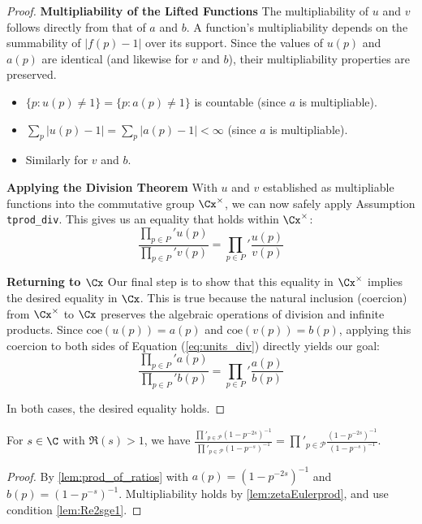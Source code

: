\begin{proof}
\textbf{Multipliability of the Lifted Functions}
The multipliability of $u$ and $v$ follows directly from that of $a$ and $b$. A function's multipliability depends on the summability of $|f(p) - 1|$ over its support. Since the values of $u(p)$ and $a(p)$ are identical (and likewise for $v$ and $b$), their multipliability properties are preserved.
\begin{itemize}
\item $\{p : u(p) \neq 1\} = \{p : a(p) \neq 1\}$ is countable (since $a$ is multipliable).
\item $\sum_{p} |u(p) - 1| = \sum_{p} |a(p) - 1| < \infty$ (since $a$ is multipliable).
\item Similarly for $v$ and $b$.
\end{itemize}

\textbf{Applying the Division Theorem}
With $u$ and $v$ established as multipliable functions into the commutative group $\Cx^\times$, we can now safely apply Assumption \texttt{tprod\_div}. This gives us an equality that holds within $\Cx^\times$:
\begin{equation}
\frac{\prod_{p \in P}' u(p)}{\prod_{p \in P}' v(p)} = \prod_{p \in P}' \frac{u(p)}{v(p)}
\label{eq:units_div}
\end{equation}

\textbf{Returning to $\Cx$}
Our final step is to show that this equality in $\Cx^\times$ implies the desired equality in $\Cx$. This is true because the natural inclusion (coercion) from $\Cx^\times$ to $\Cx$ preserves the algebraic operations of division and infinite products. Since $\text{coe}(u(p)) = a(p)$ and $\text{coe}(v(p)) = b(p)$, applying this coercion to both sides of Equation (\ref{eq:units_div}) directly yields our goal:
\[\frac{\prod_{p \in P}' a(p)}{\prod_{p \in P}' b(p)} = \prod_{p \in P}' \frac{a(p)}{b(p)}\]

In both cases, the desired equality holds.
\end{proof}

\begin{lemma}\label{lem:simplify_prod_ratio} 
\leanok
{}
For $s\in\C$ with $\Re(s)>1$, we have $\frac{\prod'_{p\in\mathcal{P}}(1-p^{-2s})^{-1}}{\prod'_{p\in\mathcal{P}}(1-p^{-s})^{-1}} = \prod'_{p\in\mathcal{P}}\frac{(1-p^{-2s})^{-1}}{(1-p^{-s})^{-1}}$.
\end{lemma}
\begin{proof} \leanok
{}
By \cref{lem:prod_of_ratios} with $a(p)=(1-p^{-2s})^{-1}$ and $b(p)=(1-p^{-s})^{-1}$. Multipliability holds by \cref{lem:zetaEulerprod}, and use condition \cref{lem:Re2sge1}.
\end{proof}

